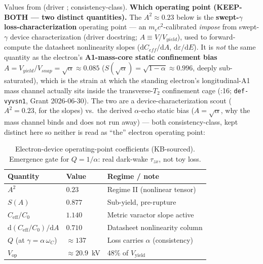 Values from  (driver \texttt{}; consistency-class). \textbf{Which operating point (KEEP-BOTH --- two distinct quantities).} The $A^2 \approx 0.23$ below is the \textbf{swept-$\gamma$ loss-characterization} operating point --- an $m_ec^2$-calibrated \emph{impose} from swept-$\gamma$ device characterization (driver docstring; $A \equiv V/V_{yield}$), used to forward-compute the datasheet nonlinearity slopes ($\mathrm{d}C_{eff}/\mathrm{d}A$, $\mathrm{d}\varepsilon/\mathrm{d}E$). It is \emph{not} the same quantity as the electron's \textbf{A1-mass-core static confinement bias} $A = V_{yield}/V_{snap} = \sqrt{\alpha} \approx 0.085$ ($S(\sqrt\alpha)=\sqrt{1-\alpha}\approx0.996$, deeply sub-saturated), which is the strain at which the standing electron's longitudinal-A1 mass channel actually sits inside the transverse-$T_2$ confinement cage (:16; \texttt{def-vyvsn1}, Grant 2026-06-30). The two are a device-characterization scout ($A^2=0.23$, for the slopes) vs.\ the derived $\alpha$-echo static bias ($A=\sqrt\alpha$, why the mass channel binds and does not run away) --- both consistency-class, kept distinct here so neither is read as ``the'' electron operating point:

\begin{table}[htbp]
\centering\footnotesize
\begin{tabular}{@{}l l l@{}}
\toprule
\textbf{Quantity} & \textbf{Value} & \textbf{Regime / note} \\
\midrule
$A^2$ & $0.23$ & Regime II (nonlinear tensor) \\
$S(A)$ & $0.877$ & Sub-yield, pre-rupture \\
$C_{\mathrm{eff}}/C_0$ & $1.140$ & Metric varactor slope active \\
$\mathrm{d}(C_{\mathrm{eff}}/C_0)/\mathrm{d}A$ & $0.710$ & Datasheet nonlinearity column \\
$Q$ (at $\gamma = \alpha\,\omega_C$) & $\approx 137$ & Loss carries $\alpha$ (consistency) \\
$V_{\mathrm{op}}$ & $\approx 20.9$~kV & $48\%$ of $V_{\mathrm{yield}}$ \\
\bottomrule
\end{tabular}
\caption{Electron-device operating-point coefficients (KB-sourced). Emergence gate for $Q = 1/\alpha$: real dark-wake $\tau_{zx}$, not toy loss.}
\label{tab:vol9_electron_op_coefficients}
\end{table}

